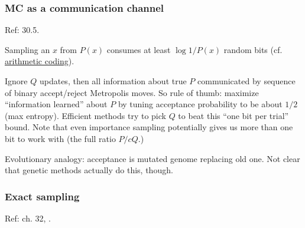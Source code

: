 \documentclass[notitlepage,openany,11pt]{report}
\numberwithin{equation}{section}
\theoremstyle{plain}%
\begin{document}
\subsubsection{MC as a communication channel} 

Ref: \cite{MacKay:03} 30.5.  

Sampling an $x$ from $P(x)$ consumes at least $\log 1/P(x)$ random bits (cf. \href{https://en.wikipedia.org/wiki/Arithmetic_coding}{arithmetic coding}). 

Ignore $Q$ updates, then all information about true $P$ communicated by sequence of binary accept/reject Metropolis moves. So rule of thumb: maximize ``information learned'' about $P$ by tuning acceptance probability to be about $1/2$ (max entropy). Efficient methods try to pick $Q$ to beat this ``one bit per trial'' bound. Note that even importance sampling potentially gives us more than one bit to work with (the full ratio $P/ cQ$.)

Evolutionary analogy: acceptance is mutated genome replacing old one. Not clear that genetic methods actually do this, though. 

\subsubsection{Exact sampling} 
Ref: \cite{MacKay:03} ch. 32, \cite{ProppWilson:96}. 
\end{document}
